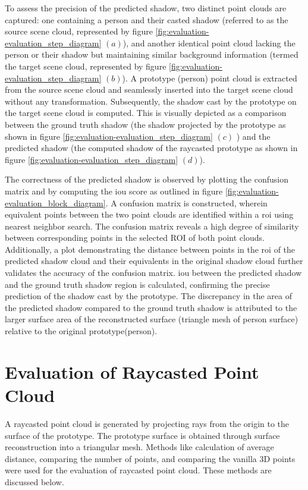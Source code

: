 To assess the precision of the predicted shadow, two distinct point clouds are captured: one containing a person and their casted shadow (referred to as the source scene cloud, represented by figure \ref{fig:evaluation-evaluation_step_diagram} \((a)\)), and another identical point cloud lacking the person or their shadow but maintaining similar background information (termed the target scene cloud, represented by figure \ref{fig:evaluation-evaluation_step_diagram} \((b)\)). A prototype (person) point cloud is extracted from the source scene cloud and seamlessly inserted into the target scene cloud without any transformation. Subsequently, the shadow cast by the prototype on the target scene cloud is computed. This is visually depicted as a comparison between the ground truth shadow (the shadow projected by the prototype as shown in figure \ref{fig:evaluation-evaluation_step_diagram} \((c)\) ) and the predicted shadow (the computed shadow of the raycasted prototype as shown in figure \ref{fig:evaluation-evaluation_step_diagram} \((d)\)).

The correctness of the predicted shadow is observed by plotting the confusion matrix and by computing the \acrshort{iou} score as outlined in figure \ref{fig:evaluation-evaluation_block_diagram}. A confusion matrix is constructed, wherein equivalent points between the two point clouds are identified within a \acrfull{roi} using nearest neighbor search. The confusion matrix reveals a high degree of similarity between corresponding points in the selected ROI of both point clouds. Additionally, a plot demonstrating the distance between points in the \acrshort{roi} of the predicted shadow cloud and their equivalents in the original shadow cloud further validates the accuracy of the confusion matrix. \acrfull{iou} between the predicted shadow and the ground truth shadow region is calculated, confirming the precise prediction of the shadow cast by the prototype. The discrepancy in the area of the predicted shadow compared to the ground truth shadow is attributed to the larger surface area of the reconstructed surface (triangle mesh of person surface) relative to the original prototype(person).

\section{Evaluation of Raycasted Point Cloud}

A raycasted point cloud is generated by projecting rays from the origin to the surface of the prototype. The prototype surface is obtained through surface reconstruction into a triangular mesh. Methods like calculation of average distance, comparing the number of points, and comparing the vanilla 3D points were used for the evaluation of raycasted point cloud. These methods are discussed below.
